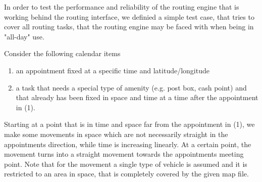 
In order to test the performance and reliability of the routing engine that is working behind the routing interface, we definied a simple test case, that tries to cover all routing tasks, that the routing engine may be faced with when being in "all-day" use.\newline

Consider the following calendar items
\begin{enumerate}
	\item an appointment fixed at a specific time and latitude/longitude
	\item a task that needs a special type of amenity (e.g. post box, cash point) and that already has been fixed in space and time at a time after the appointment in (1).
\end{enumerate}

Starting at a point that is in time and space far from the appointment in (1), we make some movements in space which are not necessarily straight in the appointments direction, while time is increasing linearly. At a certain point, the movement turns into a straight movement towards the appointments meeting point. Note that for the movement a single type of vehicle is assumed and it is restricted to an area in space, that is completely covered by the given map file.\newline

